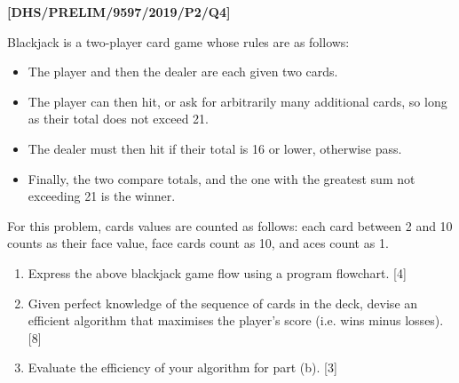 \item \textbf{{[}DHS/PRELIM/9597/2019/P2/Q4{]} }

Blackjack is a two-player card game whose rules are as follows:
\begin{itemize}
\item The player and then the dealer are each given two cards. 
\item The player can then \textquotedbl hit\textquotedbl , or ask for
arbitrarily many additional cards, so long as their total does not
exceed 21. 
\item The dealer must then hit if their total is 16 or lower, otherwise
pass. 
\item Finally, the two compare totals, and the one with the greatest sum
not exceeding 21 is the winner.
\end{itemize}
For this problem, cards values are counted as follows: each card between
2 and 10 counts as their face value, face cards count as 10, and aces
count as 1. 
\begin{enumerate}
\item Express the above blackjack game flow using a program flowchart. \hfill{}{[}4{]}
\item Given perfect knowledge of the sequence of cards in the deck, devise
an efficient algorithm that maximises the player's score (i.e. wins
minus losses). \hfill{} {[}8{]}
\item Evaluate the efficiency of your algorithm for part (b). \hfill{}{[}3{]}
\end{enumerate}